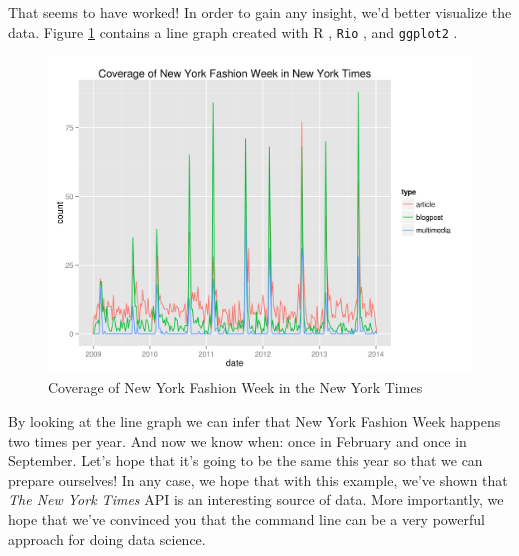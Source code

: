 \documentclass[
]{book}
\newenvironment{Shaded}{\begin{snugshade}}{\end{snugshade}}
\newcommand{\ExtensionTok}[1]{#1}
\newcommand{\KeywordTok}[1]{\textcolor[rgb]{0.13,0.29,0.53}{\textbf{#1}}}
\newcommand{\NormalTok}[1]{#1}
\newcommand{\OperatorTok}[1]{\textcolor[rgb]{0.81,0.36,0.00}{\textbf{#1}}}
\newcommand{\StringTok}[1]{\textcolor[rgb]{0.31,0.60,0.02}{#1}}
\theoremstyle{definition}
\theoremstyle{definition}
\theoremstyle{definition}
\theoremstyle{remark}
\begin{document}
That seems to have worked! In order to gain any insight, we'd better visualize the data. Figure \ref{fig:fashion-week} contains a line graph created with R \citep{R}, \texttt{Rio} \citep{Rio}, and \texttt{ggplot2} \citep{Wickham2009}.

\begin{Shaded}
\end{Shaded}

\begin{figure}

{\centering \includegraphics[width=32.81in]{images/nyt-fashion-week-multi} 

}

\caption{Coverage of New York Fashion Week in the New York Times}\label{fig:fashion-week}
\end{figure}

By looking at the line graph we can infer that New York Fashion Week happens two times per year. And now we know when: once in February and once in September. Let's hope that it's going to be the same this year so that we can prepare ourselves! In any case, we hope that with this example, we've shown that \emph{The New York Times} API is an interesting source of data. More importantly, we hope that we've convinced you that the command line can be a very powerful approach for doing data science.
\end{document}
